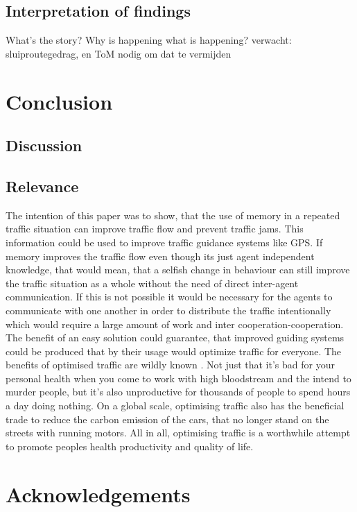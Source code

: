 \documentclass[a4paper,hidelinks]{article}
\begin{document}
\subsection{Interpretation of findings}
What's the story? Why is happening what is happening? verwacht: sluiproutegedrag, en ToM nodig om dat te vermijden

\section{Conclusion}
\subsection{Discussion}
\subsection{Relevance}
The intention of this paper was to show, that the use of memory in a repeated traffic situation can improve traffic flow and prevent traffic jams. This information could be used to improve traffic guidance systems like GPS. If memory improves the traffic flow even though its just agent independent knowledge, that would mean, that a selfish change in behaviour can still improve the traffic situation as a whole without the need of direct inter-agent communication. If this is not possible it would be necessary for the agents to communicate with one another in order to distribute the traffic intentionally which would require a large amount of work and inter cooperation-cooperation. The benefit of an easy solution could guarantee, that improved guiding systems could be produced that by their usage would optimize traffic for everyone. The benefits of optimised traffic are wildly known \cite{france2003multiagent}. Not just that it's bad for your personal health when you come to work with high bloodstream and the intend to murder people, but it's also unproductive for thousands of people to spend hours a day doing nothing. On a global scale, optimising traffic also has the beneficial trade to reduce the carbon emission of the cars, that no longer stand on the streets with running motors. All in all, optimising traffic is a worthwhile attempt to promote peoples health productivity and quality of life. 

\section{Acknowledgements}



\end{document}
